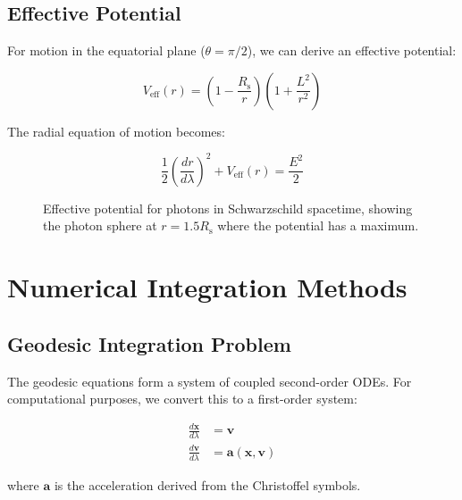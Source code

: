 \documentclass[12pt,a4paper]{article}
\theoremstyle{definition}
\theoremstyle{remark}
\newcommand{\Rs}{R_{\text{s}}}
\begin{document}
\subsection{Effective Potential}

For motion in the equatorial plane ($\theta = \pi/2$), we can derive an effective potential:

\begin{equation}
    V_{\text{eff}}(r) = \left(1 - \frac{\Rs}{r}\right)\left(1 + \frac{L^2}{r^2}\right)
\end{equation}

The radial equation of motion becomes:

\begin{equation}
    \frac{1}{2}\left(\frac{dr}{d\lambda}\right)^2 + V_{\text{eff}}(r) = \frac{E^2}{2}
\end{equation}

\begin{figure}[H]
    \centering
    \caption{Effective potential for photons in Schwarzschild spacetime, showing the photon sphere at $r = 1.5\Rs$ where the potential has a maximum.}
    \label{fig:effective_potential}
\end{figure}

\section{Numerical Integration Methods}

\subsection{Geodesic Integration Problem}

The geodesic equations form a system of coupled second-order ODEs. For computational purposes, we convert this to a first-order system:

\begin{align}
    \frac{d\mathbf{x}}{d\lambda} &= \mathbf{v} \\
    \frac{d\mathbf{v}}{d\lambda} &= \mathbf{a}(\mathbf{x}, \mathbf{v})
\end{align}

where $\mathbf{a}$ is the acceleration derived from the Christoffel symbols.
\end{document}
